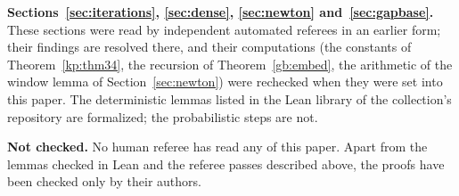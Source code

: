 \documentclass[11pt]{amsart}
\theoremstyle{definition}
\theoremstyle{remark}
\begin{document}
\medskip\noindent\textbf{Sections~\ref{sec:iterations}, \ref{sec:dense}, \ref{sec:newton}
and~\ref{sec:gapbase}.} These sections were read by independent automated referees in an earlier
form; their findings are resolved there, and their computations (the constants of
Theorem~\ref{kp:thm34}, the recursion of Theorem~\ref{gb:embed}, the arithmetic of the window
lemma of Section~\ref{sec:newton}) were rechecked when they were set into this paper. The
deterministic lemmas listed in the Lean library of the collection's repository are formalized; the
probabilistic steps are not.

\medskip\noindent\textbf{Not checked.} No human referee has read any of this paper. Apart from
the lemmas checked in Lean and the referee passes described above, the proofs have been checked
only by their authors.
\end{document}

